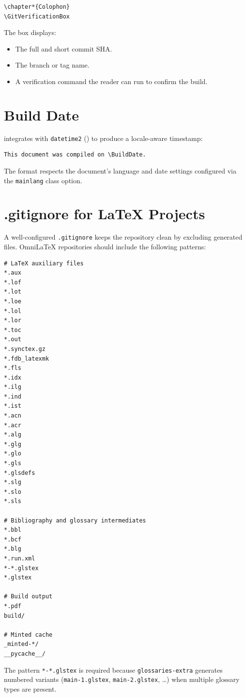 \begin{verbatim}
\chapter*{Colophon}
\GitVerificationBox
\end{verbatim}

The box displays:
\begin{itemize}
  \item The full and short commit SHA.
  \item The branch or tag name.
  \item A verification command the reader can run to confirm the build.
\end{itemize}

\section{Build Date}

 integrates with \texttt{datetime2} () to produce
a locale-aware timestamp:

\begin{verbatim}
This document was compiled on \BuildDate.
\end{verbatim}

The format respects the document's language and date settings configured
via the \texttt{mainlang} class option.

\section{.gitignore for LaTeX Projects}

A well-configured \texttt{.gitignore} keeps the repository clean by
excluding generated files.  OmniLaTeX repositories should include the
following patterns:

\begin{verbatim}
# LaTeX auxiliary files
*.aux
*.lof
*.lot
*.loe
*.lol
*.lor
*.toc
*.out
*.synctex.gz
*.fdb_latexmk
*.fls
*.idx
*.ilg
*.ind
*.ist
*.acn
*.acr
*.alg
*.glg
*.glo
*.gls
*.glsdefs
*.slg
*.slo
*.sls

# Bibliography and glossary intermediates
*.bbl
*.bcf
*.blg
*.run.xml
*-*.glstex
*.glstex

# Build output
*.pdf
build/

# Minted cache
_minted-*/
__pycache__/
\end{verbatim}

The pattern \texttt{*-*.glstex} is required because
\texttt{glossaries-extra} generates numbered variants
(\texttt{main-1.glstex}, \texttt{main-2.glstex}, \ldots) when multiple
glossary types are present.

